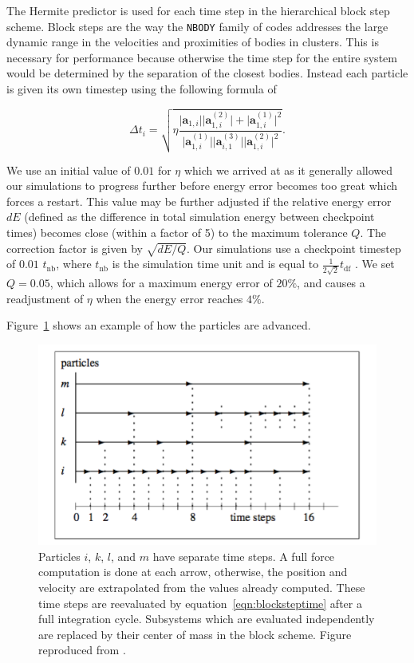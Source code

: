 \documentclass[preprint1]{aastex}
\numberwithin{equation}{section}
\begin{document}
The Hermite predictor is used for each time step in the hierarchical block step scheme. Block steps are the way the \texttt{NBODY} family of codes addresses the large dynamic range in the velocities and proximities of bodies in clusters. This is necessary for performance because otherwise the time step for the entire system would be determined by the separation of the closest bodies. Instead each particle is given its own timestep using the following formula of \citet{2017Khalisi} 

\begin{equation}
\Delta t_{i} = \sqrt{\eta \frac{\lvert \mathbf{a}_{1,i}\rvert \lvert \mathbf{a}^{(2)}_{1,i}\rvert + \lvert \mathbf{a}^{(1)}_{1,i} \rvert ^2}{\lvert \mathbf{a}^{(1)}_{1,i} \rvert \lvert \mathbf{a}^{(3)}_{i,1} \rvert \lvert \mathbf{a}^{(2)}_{1,i}\rvert^2}}.
\label{eqn:blocksteptime}
\end{equation}

We use an initial value of $0.01$ for $\eta$ which we arrived at as it generally allowed our simulations to progress further before energy error becomes too great which forces a restart.  This value may be further adjusted if the relative energy error $dE$ (defined as the difference in total simulation energy between checkpoint times) becomes close (within a factor of 5) to the maximum tolerance $Q$. The correction factor is given by $\sqrt{dE/Q}$.  Our simulations use a checkpoint timestep of $0.01$ $t_{\mathrm{nb}}$, where $t_{\mathrm{nb}}$ is the simulation time unit and is equal to $\frac{1}{2\sqrt{2}} t_{\mathrm{df}}$ \citep{2017Khalisi}. We set $Q=0.05$, which allows for a maximum energy error of $20\%$, and causes a readjustment of $\eta$ when the energy error reaches $4\%$.

Figure~\ref{fig:blockstep} shows an example of how the particles are advanced. 
\begin{figure}
    \centering
    \includegraphics[width=\textwidth]{KhalisiTimeStep}
    \caption{Particles $i$, $k$, $l$, and $m$ have separate time steps. A full force computation is done at each arrow, otherwise, the position and velocity are extrapolated from the values already computed.  These time steps are reevaluated by equation~\ref{eqn:blocksteptime} after a full integration cycle. Subsystems which are evaluated independently are replaced by their center of mass in the block scheme. Figure reproduced from \citet{2017Khalisi}.}
    \label{fig:blockstep}
\end{figure}
\end{document}
